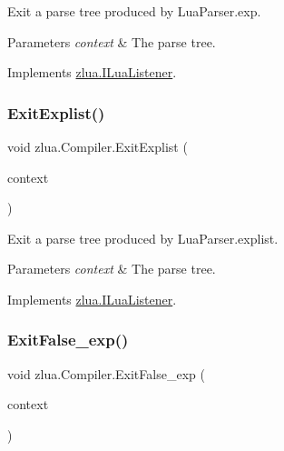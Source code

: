 Exit a parse tree produced by Lua\+Parser.\+exp. 


\begin{DoxyParams}{Parameters}
{\em context} & The parse tree.\\
\hline
\end{DoxyParams}


Implements \mbox{\hyperlink{interfacezlua_1_1_i_lua_listener_adb4a861f691615f081c5910a78e507bd}{zlua.\+I\+Lua\+Listener}}.

\mbox{\label{classzlua_1_1_compiler_a54d71e09af5891553fa884334ce40a14}} 
\subsubsection{\texorpdfstring{Exit\+Explist()}{ExitExplist()}}
{\footnotesize\ttfamily void zlua.\+Compiler.\+Exit\+Explist (\begin{DoxyParamCaption}\item[{\mbox{[}\+Not\+Null\mbox{]} \mbox{\hyperlink{classzlua_1_1_lua_parser_1_1_explist_context}{Lua\+Parser.\+Explist\+Context}}}]{context }\end{DoxyParamCaption})}



Exit a parse tree produced by Lua\+Parser.\+explist. 


\begin{DoxyParams}{Parameters}
{\em context} & The parse tree.\\
\hline
\end{DoxyParams}


Implements \mbox{\hyperlink{interfacezlua_1_1_i_lua_listener_ad4f41520ee19a409350ab83e01086217}{zlua.\+I\+Lua\+Listener}}.

\mbox{\label{classzlua_1_1_compiler_a0e5e286cdb08d9d9ef551f10f4447cf4}} 
\subsubsection{\texorpdfstring{Exit\+False\+\_\+exp()}{ExitFalse\_exp()}}
{\footnotesize\ttfamily void zlua.\+Compiler.\+Exit\+False\+\_\+exp (\begin{DoxyParamCaption}\item[{\mbox{[}\+Not\+Null\mbox{]} \mbox{\hyperlink{classzlua_1_1_lua_parser_1_1_false__exp_context}{Lua\+Parser.\+False\+\_\+exp\+Context}}}]{context }\end{DoxyParamCaption})}



